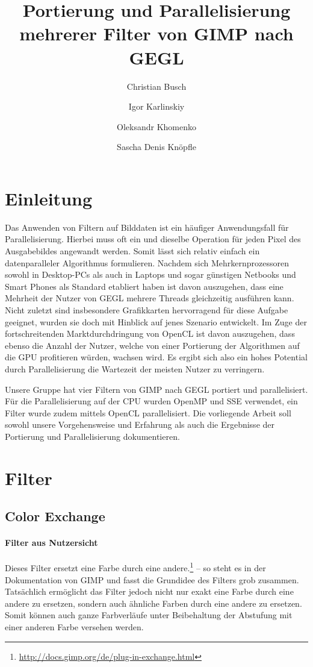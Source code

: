 \documentclass[10pt,a4paper]{article}
\begin{document}
\author{Christian Busch
\and
Igor Karlinskiy
\and
Oleksandr Khomenko
\and
Sascha Denis Knöpfle
}
\title{Portierung und Parallelisierung mehrerer Filter von GIMP nach GEGL}
\maketitle

\section{Einleitung}
Das Anwenden von Filtern auf Bilddaten ist ein häufiger Anwendungsfall für Parallelisierung. Hierbei muss oft ein und dieselbe Operation für jeden Pixel des Ausgabebildes angewandt werden. Somit lässt sich relativ einfach ein datenparalleler Algorithmus formulieren. Nachdem sich Mehrkernprozessoren sowohl in Desktop-PCs als auch in Laptops und sogar günstigen Netbooks und Smart Phones als Standard etabliert haben ist davon auszugehen, dass eine Mehrheit der Nutzer von GEGL mehrere Threads gleichzeitig ausführen kann.  Nicht zuletzt sind insbesondere Grafikkarten hervorragend für diese Aufgabe geeignet, wurden sie doch mit Hinblick auf jenes Szenario entwickelt. Im Zuge der fortschreitenden Marktdurchdringung von OpenCL ist davon auszugehen, dass ebenso die Anzahl der Nutzer, welche von einer Portierung der Algorithmen auf die GPU profitieren würden, wachsen wird. Es ergibt sich also ein hohes Potential durch Parallelisierung die Wartezeit der meisten Nutzer zu verringern.

Unsere Gruppe hat vier Filtern von GIMP nach GEGL portiert und parallelisiert. Für die Parallelisierung auf der CPU wurden OpenMP und SSE verwendet, ein Filter wurde zudem mittels OpenCL parallelisiert.
Die vorliegende Arbeit soll sowohl unsere Vorgehensweise und Erfahrung als auch die Ergebnisse der Portierung und Parallelisierung dokumentieren. 

\section{Filter}
\subsection{Color Exchange}
\paragraph{Filter aus Nutzersicht}
\glqq Dieses Filter ersetzt eine Farbe durch eine andere.\grqq\footnote{\url{http://docs.gimp.org/de/plug-in-exchange.html}} -- so steht es in der Dokumentation von GIMP und fasst die Grundidee des Filters grob zusammen. Tatsächlich ermöglicht das Filter jedoch nicht nur exakt eine Farbe durch eine andere zu ersetzen, sondern auch ähnliche Farben durch eine andere zu ersetzen. Somit können auch ganze Farbverläufe unter Beibehaltung der Abstufung mit einer anderen Farbe versehen werden.
\end{document}
